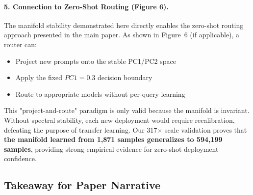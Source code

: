 \paragraph{5. Connection to Zero-Shot Routing (Figure 6).}
The manifold stability demonstrated here directly enables the zero-shot routing approach presented in the main paper. As shown in Figure~6 (if applicable), a router can:
\begin{itemize}[leftmargin=*,noitemsep,topsep=0pt]
    \item Project new prompts onto the stable PC1/PC2 space
    \item Apply the fixed $PC1=0.3$ decision boundary
    \item Route to appropriate models without per-query learning
\end{itemize}

This "project-and-route" paradigm is only valid because the manifold is invariant. Without spectral stability, each new deployment would require recalibration, defeating the purpose of transfer learning. Our 317$\times$ scale validation proves that \textbf{the manifold learned from 1,871 samples generalizes to 594,199 samples}, providing strong empirical evidence for zero-shot deployment confidence.

\subsection{Takeaway for Paper Narrative}

